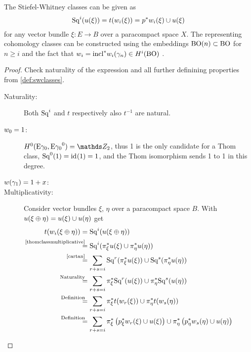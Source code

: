 \begin{Thm}
  The Stiefel-Whitney classes can be given as
  \begin{gather*}
    \mathrm{Sq}^{i}(u(\xi)) = t(w_i(\xi)) = {p}^* w_i(\xi) \cup u(\xi)
  \end{gather*}
  for any vector bundle $\xi\colon E\to B$ over a paracompact space
  $X$.
  The representing cohomology classes can be constructed using the
  embeddings $\mathrm{BO}(n)\subset\mathrm{BO}$ for $n\geq i$ and the fact that
  $w_i={\mathrm{incl}}^*w_i(\gamma_n)\in H^i(\mathrm{BO})$ %
  .
  \begin{proof}
    Check naturality of the expression and all further
    definining properties from \ref{def:swclasses}.
    \begin{description}
    \item[Naturality:] Both $\mathrm{Sq}^{i}$ and $t$ respectively also $t^{-1}$
      are natural.
    \item[$w_0=1$:]
      $H^0(\thomspacepair{\E{\gamma_0}}) = \Zmod2$, thus 1 is the only
      candidate for a Thom class, $\mathrm{Sq}^{0}(1) = \mathrm{id}_{}(1) = 1$, and the Thom
      isomorphism sends 1 to 1 in this degree.
    \item[$w(\gamma_1)=1+x$:] %
    \item[Multiplicativity:] %
      Consider vector bundles $\xi$, $\eta$ over a paracompact space
      $B$. With $u(\xi\oplus\eta)=u(\xi)\cup u(\eta)$ get
      \begin{align*} %
        \thomiso(\w_i(\xi\oplus\eta))
        &= \Sq i(\u(\xi\oplus\eta)) \\
        &\overset{\mathllap{\text{\autoref{thomclassmultiplicative}}}}=
          \Sq i(\pb\pi_\xi\u(\xi) \cup \pb\pi_\eta\u(\eta))\\
        &\overset{\mathllap{\text{\ref{cartan}}}}=
          \sum_{r+s=i}
          \Sq r(\pb\pi_\xi\u(\xi)) \cup \Sq s(\pb \pi_\eta\u(\eta)) \\
        &\overset{\mathllap{\text{Naturality}}}=
          \sum_{r+s=i}
          \pb\pi_\xi\Sq r(\u(\xi)) \cup \pb \pi_\eta\Sq s(\u(\eta)) \\
        &\overset{\mathllap{\text{Definition}}}=
          \sum_{r+s=i}
          \pb\pi_\xi\thomiso(\w_r(\xi))
          \cup \pb\pi_\eta\thomiso(\w_s(\eta)) \\
        &\overset{\mathllap{\text{Definition}}}=
          \sum_{r+s=i}
          \pb\pi_\xi \left(\pb p_\xi  \w_r(\xi)  \cup \u(\xi) \right)
          \cup
          \pb\pi_\eta\left(\pb p_\eta \w_s(\eta) \cup \u(\eta)\right) \\

\end{align*}
\end{description}
\end{proof}
\end{Thm}
